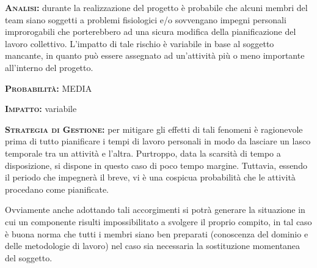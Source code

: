 \begin{description}
	\item{\scshape\bfseries Analisi:} durante la realizzazione del progetto è probabile che alcuni membri del team siano soggetti a problemi fisiologici e/o sovvengano impegni personali improrogabili che porterebbero ad una sicura modifica della pianificazione del lavoro collettivo. L'impatto di tale rischio è variabile in base al soggetto mancante, in quanto può essere assegnato ad un'attività più o meno importante all'interno del progetto. 
	\item{\scshape\bfseries Probabilità:} MEDIA
	\item{\scshape\bfseries Impatto:} variabile
	\item{\scshape\bfseries Strategia di Gestione:} per mitigare gli effetti di tali fenomeni è ragionevole prima di tutto pianificare i tempi di lavoro personali in modo da lasciare un lasco temporale tra un attività e l'altra.
Purtroppo, data la scarsità di tempo a disposizione, si dispone in questo caso di poco tempo margine. Tuttavia, essendo il periodo che impegnerà il  breve, vi è una cospicua probabilità che le attività procedano come pianificate.
	
Ovviamente anche adottando tali accorgimenti si potrà generare la situazione in cui un componente risulti impossibilitato a svolgere il proprio compito, in tal caso è buona norma che tutti i membri siano ben preparati (conoscenza del dominio e delle metodologie di lavoro) nel caso sia necessaria la sostituzione momentanea del soggetto.
\end{description}

